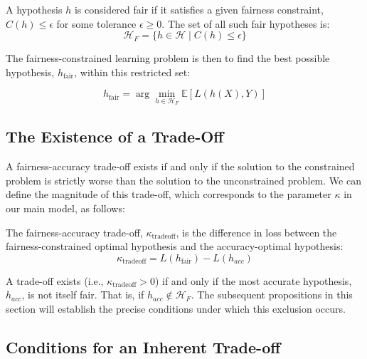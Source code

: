 \begin{definition}
A hypothesis $h$ is considered fair if it satisfies a given fairness constraint, $C(h) \leq \epsilon$ for some tolerance $\epsilon \geq 0$. The set of all such fair hypotheses is:
\begin{equation}
\mathcal{H}_F = \{h \in \mathcal{H} \mid C(h) \leq \epsilon \}
\end{equation}
\end{definition}

The fairness-constrained learning problem is then to find the best possible hypothesis, $h_{\text{fair}}$, within this restricted set:

\begin{equation}
h_{\text{fair}} = \arg\min_{h \in \mathcal{H}_F} \mathbb{E}[L(h(X), Y)]
\end{equation}

\subsection{The Existence of a Trade-Off}

A fairness-accuracy trade-off exists if and only if the solution to the constrained problem is strictly worse than the solution to the unconstrained problem. We can define the magnitude of this trade-off, which corresponds to the parameter $\kappa$ in our main model, as follows:

\begin{definition}
The fairness-accuracy trade-off, $\kappa_{\text{tradeoff}}$, is the difference in loss between the fairness-constrained optimal hypothesis and the accuracy-optimal hypothesis:
\begin{equation}
\kappa_{\text{tradeoff}} = L(h_{\text{fair}}) - L(h_{acc})
\end{equation}
\end{definition}

A trade-off exists (i.e., $\kappa_{\text{tradeoff}} > 0$) if and only if the most accurate hypothesis, $h_{acc}$, is not itself fair. That is, if $h_{acc} \notin \mathcal{H}_F$. The subsequent propositions in this section will establish the precise conditions under which this exclusion occurs.

\subsection{Conditions for an Inherent Trade-off}

